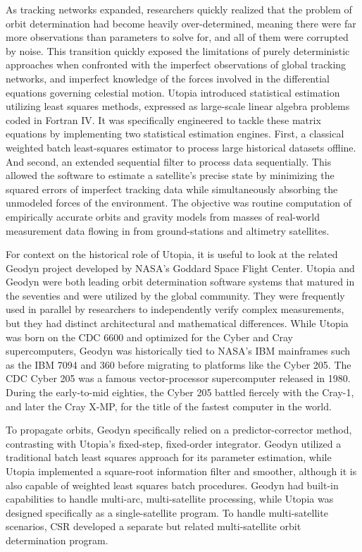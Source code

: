 As tracking networks expanded, researchers quickly realized that the problem of orbit determination had become heavily over-determined, meaning there were far more observations than parameters to solve for, and all of them were corrupted by noise. This transition quickly exposed the limitations of purely deterministic approaches when confronted with the imperfect observations of global tracking networks, and imperfect knowledge of the forces involved in the differential equations governing celestial motion. Utopia introduced statistical estimation utilizing least squares methods, expressed as large-scale linear algebra problems coded in Fortran IV. It was specifically engineered to tackle these matrix equations by implementing two statistical estimation engines. First, a classical weighted batch least-squares estimator to process large historical datasets offline. And second, an extended sequential filter to process data sequentially. This allowed the software to estimate a satellite's precise state by minimizing the squared errors of imperfect tracking data while simultaneously absorbing the unmodeled forces of the environment. The objective was routine computation of empirically accurate orbits and gravity models from masses of real-world measurement data flowing in from ground-stations and altimetry satellites. 

For context on the historical role of Utopia, it is useful to look at the related Geodyn project developed by NASA’s Goddard Space Flight Center. Utopia and Geodyn were both leading orbit determination software systems that matured in the seventies and were utilized by the global community. They were frequently used in parallel by researchers to independently verify complex measurements, but they had distinct architectural and mathematical differences. While Utopia was born on the CDC 6600 and optimized for the Cyber and Cray supercomputers, Geodyn was historically tied to NASA's IBM mainframes such as the IBM 7094 and 360 before migrating to platforms like the Cyber 205. The CDC Cyber 205 was a famous vector-processor supercomputer released in 1980. During the early-to-mid eighties, the Cyber 205 battled fiercely with the Cray-1, and later the Cray X-MP, for the title of the fastest computer in the world.

To propagate orbits, Geodyn specifically relied on a predictor-corrector method, contrasting with Utopia's fixed-step, fixed-order integrator. Geodyn utilized a traditional batch least squares approach for its parameter estimation, while Utopia implemented a square-root information filter and smoother, although it is also capable of weighted least squares batch procedures. Geodyn had built-in capabilities to handle multi-arc, multi-satellite processing, while Utopia was designed specifically as a single-satellite program. To handle multi-satellite scenarios, CSR developed a separate but related multi-satellite orbit determination program. 

